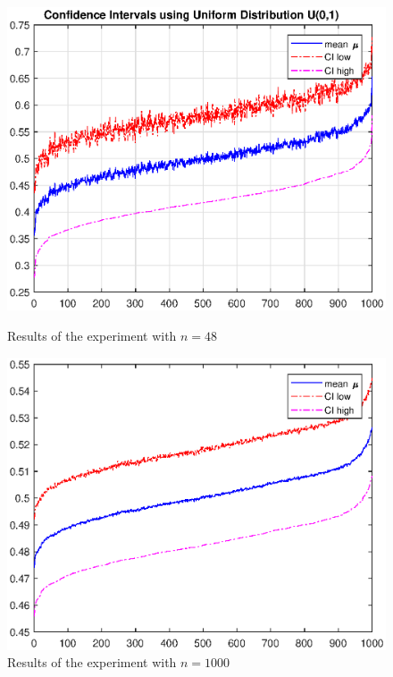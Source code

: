 \documentclass[11pt,a4paper]{article}
\begin{document}
\begin{figure}[ht]
	\centering
	\begin{minipage}{0.45\textwidth}
		\centering
		\includegraphics[width=\textwidth]{CI_48_2}
		\caption{Results of the experiment with $n=48$}
		\label{fig:CI_48_2}
	\end{minipage}
	\begin{minipage}{0.45\textwidth}
		\centering
		\includegraphics[width=\textwidth]{CI_10002}
		\caption{Results of the experiment with $n=1000$}
		\label{fig:CI_10002}
	\end{minipage}
\end{figure}
\end{document}
